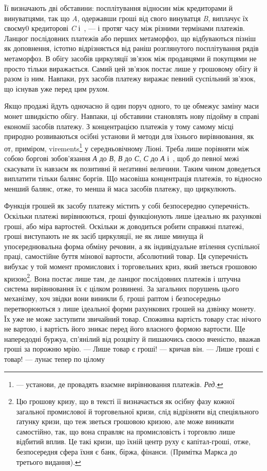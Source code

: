 \parcont{}  %
Її визначають дві обставини: посплітування відносин між кредиторами й винуватцями,
так що \emph{A}, одержавши гроші від свого винуватця \emph{B}, виплачує їх своєму0
кредиторові \emph{C} і~, — і протяг часу між різними термінами платежів.
Ланцюг послідовних платежів або перших метаморфоз, що відбуваються
пізніш як доповнення, істотно відрізняється від раніш розглянутого посплітування
рядів метаморфоз. В обігу засобів циркуляції зв’язок між продавцями й покупцями
не просто тільки виражається. Самий цей зв’язок постає лише у грошовому обігу й
разом із ним. Навпаки, рух засобів платежу виражає певний
суспільний зв’язок, що існував уже перед цим рухом.

Якщо продажі йдуть одночасно й один поруч одного, то це обмежує заміну маси монет
швидкістю обігу. Навпаки, ці обставини становлять нову підойму в справі економії
засобів платежу. З концентрацією платежів у тому самому місці природно
розвиваються осібні установи й методи для їхнього
вирівнювання, як от, приміром, virements\footnote*{
— установи, де провадять взаємне вирівнювання платежів. \emph{Ред.}
} у середньовічному Ліоні. Треба лише порівняти між собою
боргові зобов’язання \emph{А} до \emph{В}, \emph{В} до \emph{С}, \emph{С} до
\emph{А} і~, щоб до певної межі скасувати їх навзаєм як
позитивні й неґативні величини. Таким чином доведеться виплатити тільки балянс
боргів. Що масовіша концентрація платежів, то відносно менший балянс, отже, то
менша й маса засобів платежу, що циркулюють.

Функція грошей як засобу платежу містить у собі безпосередню суперечність.
Оскільки платежі вирівнюються, гроші функціонують лише ідеально як рахункові
гроші, або міра вартостей. Оскільки ж
доводиться робити справжні платежі, гроші
виступають не як засіб циркуляції, не як лише минуща й упосереднювальна форма
обміну речовин, а як індивідуальне втілення суспільної праці, самостійне буття
мінової вартости, абсолютний товар. Ця суперечність вибухає у той момент
промислових і торговельних криз, який зветься грошовою кризою\footnote{
Цю грошову кризу, що в тексті її визначається як осібну фазу кожної загальної
промислової й торговельної кризи, слід відрізняти від спеціяльного ґатунку
кризи, що теж зветься грошовою кризою, але може виникати самостійно, так, що
вона справляє на промисловість і торговлю лише відбитий вплив.
Це такі кризи, що їхній центр руху є капітал-гроші, отже, безпосередня сфера
їхня є банк, біржа, фінанси. (Примітка Маркса до третього видання).
}.
Вона постає лише там, де ланцюг послідовних платежів і штучна система
вирівнювання їх є цілком розвинені. За загальних порушень цього механізму,
хоч звідки вони виникли б, гроші раптом і безпосередньо перетворюються з лише
ідеальної форми рахункових грошей на дзвінку монету. Їх уже не може заступити
звичайний товар. Споживна вартість товару стає нічого не вартою, і вартість його
зникає перед його власного формою вартости. Ще напередодні буржуа, сп’янілий
від розцвіту й пишаючись своєю вченістю, вважав гроші за порожню мрію. — Лише
товар є гроші! — кричав він. — Лише гроші є товар! — лунає тепер по цілому
\parbreak{}  %
